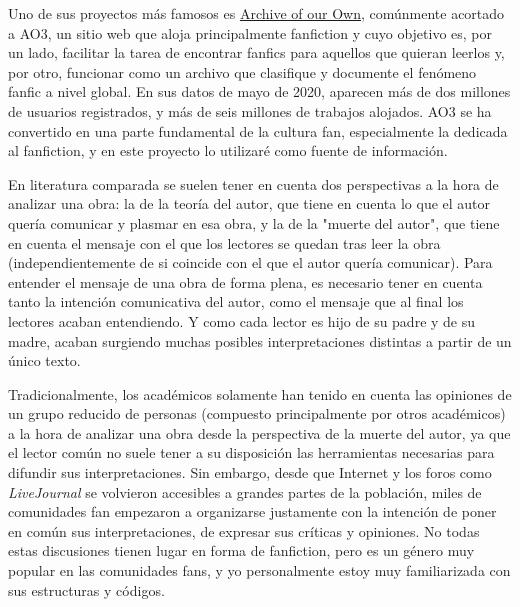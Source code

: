 \documentclass{pre-tfg}
\begin{document}
Uno de sus proyectos más famosos es \href{https://archiveofourown.org/}{Archive of our Own}, comúnmente acortado a AO3, un sitio web que aloja principalmente fanfiction y cuyo objetivo es, por un lado, facilitar la tarea de encontrar fanfics para aquellos que quieran leerlos y, por otro, funcionar como un archivo que clasifique y documente el fenómeno fanfic a nivel global. En sus datos de mayo de 2020, aparecen más de dos millones de usuarios registrados, y más de seis millones de trabajos alojados. AO3 se ha convertido en una parte fundamental de la cultura fan, especialmente la dedicada al fanfiction, y en este proyecto lo utilizaré como fuente de información.


En literatura comparada se suelen tener en cuenta dos perspectivas a la hora de analizar una obra: la de la teoría del autor, que tiene en cuenta lo que el autor quería comunicar y plasmar en esa obra, y la de la "muerte del autor"\cite{Barthes}, que tiene en cuenta el mensaje con el que los lectores se quedan tras leer la obra (independientemente de si coincide con el que el autor quería comunicar).
Para entender el mensaje de una obra de forma plena\cite{ellis_2018}, es necesario tener en cuenta tanto la intención comunicativa del autor, como el mensaje que al final los lectores acaban entendiendo. Y como cada lector es hijo de su padre y de su madre, acaban surgiendo muchas posibles interpretaciones distintas a partir de un único texto.

Tradicionalmente, los académicos solamente han tenido en cuenta las opiniones de un grupo reducido de personas (compuesto principalmente por otros académicos) a la hora de analizar una obra desde la perspectiva de la muerte del autor, ya que el lector común no suele tener a su disposición las herramientas necesarias para difundir sus interpretaciones. Sin embargo, desde que Internet y los foros como \textit{LiveJournal} se volvieron accesibles a grandes partes de la población, miles de comunidades fan empezaron a organizarse justamente con la intención de poner en común sus interpretaciones, de expresar sus críticas y opiniones. No todas estas discusiones tienen lugar en forma de fanfiction, pero es un género muy popular en las comunidades fans, y yo personalmente estoy muy familiarizada con sus estructuras y códigos.
\end{document}
